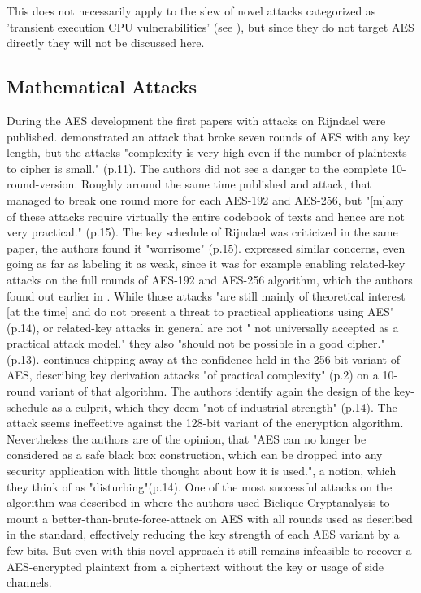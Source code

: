 This does not necessarily apply to the slew of novel attacks categorized as 'transient execution CPU vulnerabilities' (see \cite{transientexecution}), but since they do not target \ac{AES} directly they will not be discussed here.

\subsection{Mathematical Attacks}
\label{ch:mathematicalattacks}

During the \ac{AES} development the first papers with attacks on Rijndael were published. \cite{Gilbert00acollision} demonstrated an attack that broke seven rounds of \ac{AES} with any key length, but the attacks "complexity is very high even if the number of plaintexts to cipher is small." (p.11). The authors did not see a danger to the complete 10-round-version.
Roughly around the same time \cite{impcryptan} published and attack, that managed to break one round more for each AES-192 and AES-256, but "[m]any of these attacks require virtually the entire codebook of texts and hence are not very practical." (p.15).
The key schedule of Rijndael was criticized in the same paper, the authors found it "worrisome" (p.15). \cite{rkeyattack} expressed similar concerns, even going as far as labeling it as weak, since it was for example enabling related-key attacks on the full rounds of AES-192 and AES-256 algorithm, which the authors found out earlier in \cite{rkeyattack2}.  While those attacks "are still mainly of theoretical interest [at the time] and do not present a threat to practical applications using AES" (p.14), or related-key attacks in general are not " not universally accepted as a practical attack model."\cite[p. 14]{rkeyattack3} they also "should not be possible in a good cipher." \cite{rkeyattack} (p.13).
\cite{rkeyattack3} continues chipping away at the confidence held in the 256-bit variant of \ac{AES}, describing key derivation attacks "of practical complexity" (p.2) on a 10-round variant of that algorithm. The authors identify again the design of the key-schedule as a culprit, which they deem "not of industrial strength" (p.14). The attack seems ineffective against the 128-bit variant of the encryption algorithm. Nevertheless the authors are of the opinion, that "AES can no longer be considered as a safe black box construction, which can be dropped into any security application with little thought about how it is used.", a notion, which they think of as "disturbing"(p.14).
One of the most successful attacks on the algorithm was described in \cite{biclique} where the authors used Biclique Cryptanalysis to mount a better-than-brute-force-attack on \ac{AES} with all rounds used as described in the standard, effectively reducing the key strength of each \ac{AES} variant by a few bits. But even with this novel approach it still remains infeasible to recover a \ac{AES}-encrypted plaintext from a ciphertext without the key or usage of side channels.



